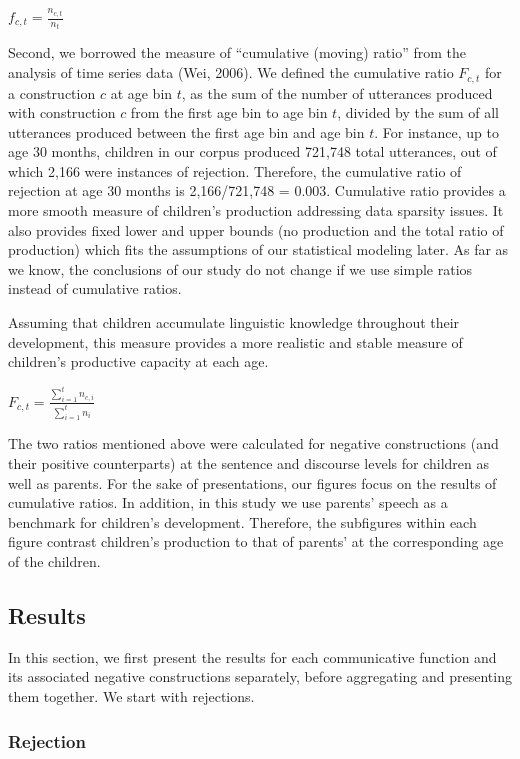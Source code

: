 \documentclass[
  man,floatsintext]{apa6}
\begin{document}
\(f_{c, t} = \frac{n_{c,t}}{n_{t}}\)

Second, we borrowed the measure of ``cumulative (moving) ratio'' from the analysis of time series data (Wei, 2006). We defined the cumulative ratio \(F_{c,t}\) for a construction \(c\) at age bin \(t\), as the sum of the number of utterances produced with construction \(c\) from the first age bin to age bin \(t\), divided by the sum of all utterances produced between the first age bin and age bin \(t\). For instance, up to age 30 months, children in our corpus produced 721,748 total utterances, out of which 2,166 were instances of rejection. Therefore, the cumulative ratio of rejection at age 30 months is 2,166/721,748 = 0.003. Cumulative ratio provides a more smooth measure of children's production addressing data sparsity issues. It also provides fixed lower and upper bounds (no production and the total ratio of production) which fits the assumptions of our statistical modeling later. As far as we know, the conclusions of our study do not change if we use simple ratios instead of cumulative ratios.

Assuming that children accumulate linguistic knowledge throughout their development, this measure provides a more realistic and stable measure of children's productive capacity at each age.

\(F_{c, t} = \frac{\sum_{i=1}^{t} n_{c,i}}{\sum_{i=1}^{t} n_{i}}\)

The two ratios mentioned above were calculated for negative constructions (and their positive counterparts) at the sentence and discourse levels for children as well as parents. For the sake of presentations, our figures focus on the results of cumulative ratios. In addition, in this study we use parents' speech as a benchmark for children's development. Therefore, the subfigures within each figure contrast children's production to that of parents' at the corresponding age of the children.

\subsection{Results}\label{results}

In this section, we first present the results for each communicative function and its associated negative constructions separately, before aggregating and presenting them together. We start with rejections.

\subsubsection{Rejection}\label{rejection}
\end{document}
